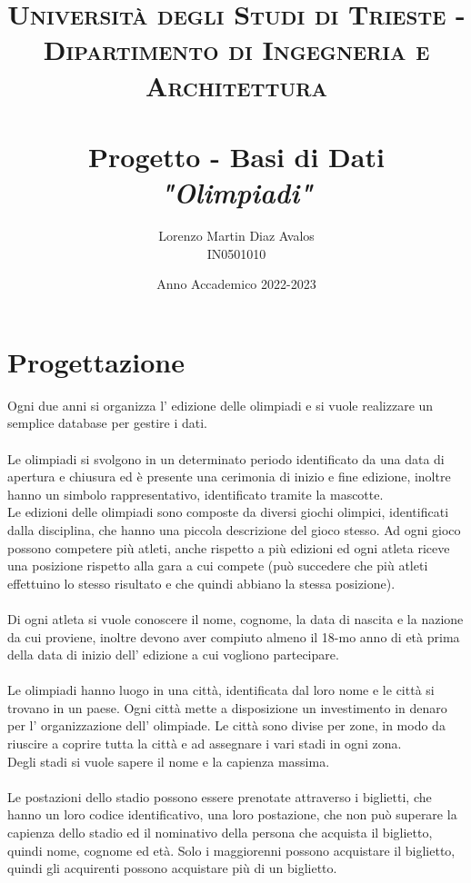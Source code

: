 \documentclass[paper=a4, fontsize=12 pt]{scrartcl} %
\title{
	\normalfont \normalsize
	\textsc{Università degli Studi di Trieste - Dipartimento di Ingegneria
		e Architettura} \\ [25pt]
	\horrule{0.5pt} \\[0.4cm]
	\huge Progetto - Basi di Dati\\
	\emph{"Olimpiadi"}
	\horrule{2pt} \\[0.5cm]
}
\author{Lorenzo Martin Diaz Avalos \\ IN0501010}
\date{\normalsize Anno Accademico 2022-2023}
\begin{document}
	\maketitle
	\tableofcontents
	\newpage
	
	\newpage
	
	\section{Progettazione}
	
	
	Ogni due anni si organizza l' edizione delle olimpiadi e si vuole realizzare un semplice database per gestire i dati.\\\\
	Le olimpiadi si svolgono in un determinato periodo identificato da una data di apertura e chiusura ed è presente una cerimonia di inizio e fine edizione, inoltre hanno un simbolo rappresentativo, identificato tramite la mascotte.\\
	Le edizioni delle olimpiadi sono composte da diversi giochi olimpici, identificati dalla disciplina, che hanno una piccola descrizione del gioco stesso. Ad ogni gioco possono competere più atleti, anche rispetto a più edizioni ed ogni atleta riceve una posizione rispetto alla gara a cui compete (può succedere che più atleti effettuino lo stesso risultato e che quindi abbiano la stessa posizione).\\\\
	Di ogni atleta si vuole conoscere il nome, cognome, la data di nascita e la nazione da cui proviene, inoltre devono aver compiuto almeno il 18-mo anno di età prima della data di inizio dell' edizione a cui vogliono partecipare.\\\\
	Le olimpiadi hanno luogo in una città, identificata dal loro nome e le città si trovano in un paese. Ogni città mette a disposizione un investimento in denaro per l' organizzazione dell' olimpiade. Le città sono divise per zone, in modo da riuscire a coprire tutta la città e ad assegnare i vari stadi in ogni zona.\\
	Degli stadi si vuole sapere il nome e la capienza massima.\\\\
	Le postazioni dello stadio possono essere prenotate attraverso i biglietti, che hanno un loro codice identificativo, una loro postazione, che non può superare la capienza dello stadio ed il nominativo della persona che acquista il biglietto, quindi nome, cognome ed età. Solo i maggiorenni possono acquistare il biglietto, quindi gli acquirenti possono acquistare più di un biglietto.
	
\end{document}
